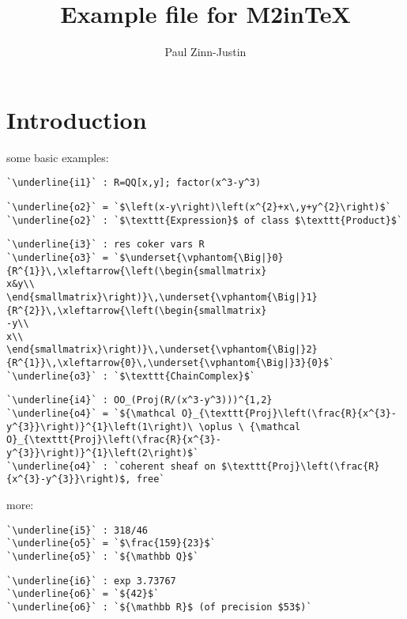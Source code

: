 \documentclass[12pt,a4paper]{amsart}
\title{Example file for M2inTeX}
\author{Paul Zinn-Justin}
\begin{document}
\maketitle

\section{Introduction}
some basic examples:
\smallskip
\begin{lstlisting}[language=Macaulay2]
`\underline{i1}` : R=QQ[x,y]; factor(x^3-y^3)
\end{lstlisting}
\begin{lstlisting}[language=Macaulay2]
`\underline{o2}` = `$\left(x-y\right)\left(x^{2}+x\,y+y^{2}\right)$`
`\underline{o2}` : `$\texttt{Expression}$ of class $\texttt{Product}$`
\end{lstlisting}
\begin{lstlisting}[language=Macaulay2]
`\underline{i3}` : res coker vars R
`\underline{o3}` = `$\underset{\vphantom{\Big|}0}{R^{1}}\,\xleftarrow{\left(\begin{smallmatrix}
x&y\\
\end{smallmatrix}\right)}\,\underset{\vphantom{\Big|}1}{R^{2}}\,\xleftarrow{\left(\begin{smallmatrix}
-y\\
x\\
\end{smallmatrix}\right)}\,\underset{\vphantom{\Big|}2}{R^{1}}\,\xleftarrow{0}\,\underset{\vphantom{\Big|}3}{0}$`
`\underline{o3}` : `$\texttt{ChainComplex}$`
\end{lstlisting}
\begin{lstlisting}[language=Macaulay2]
`\underline{i4}` : OO_(Proj(R/(x^3-y^3)))^{1,2}
`\underline{o4}` = `${\mathcal O}_{\texttt{Proj}\left(\frac{R}{x^{3}-y^{3}}\right)}^{1}\left(1\right)\ \oplus \ {\mathcal O}_{\texttt{Proj}\left(\frac{R}{x^{3}-y^{3}}\right)}^{1}\left(2\right)$`
`\underline{o4}` : `coherent sheaf on $\texttt{Proj}\left(\frac{R}{x^{3}-y^{3}}\right)$, free`
\end{lstlisting}
\smallskip

more:
\smallskip
\begin{lstlisting}[language=Macaulay2]
`\underline{i5}` : 318/46
`\underline{o5}` = `$\frac{159}{23}$`
`\underline{o5}` : `${\mathbb Q}$`
\end{lstlisting}
\begin{lstlisting}[language=Macaulay2]
`\underline{i6}` : exp 3.73767
`\underline{o6}` = `${42}$`
`\underline{o6}` : `${\mathbb R}$ (of precision $53$)`
\end{lstlisting}
\smallskip
\end{document}
